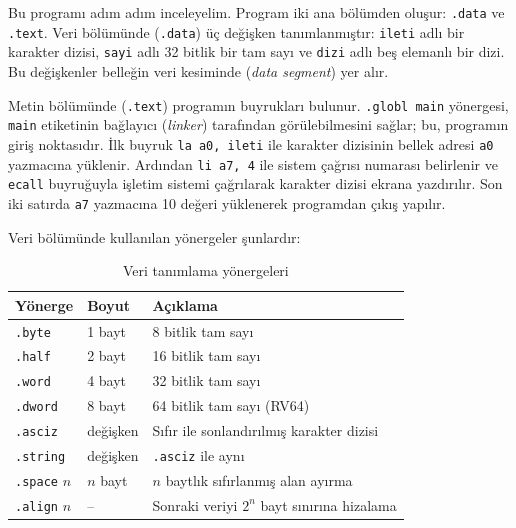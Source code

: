 Bu programı adım adım inceleyelim. Program iki ana bölümden oluşur: \texttt{.data} ve \texttt{.text}. Veri bölümünde (\texttt{.data}) üç değişken tanımlanmıştır: \texttt{ileti} adlı bir karakter dizisi, \texttt{sayi} adlı 32 bitlik bir tam sayı ve \texttt{dizi} adlı beş elemanlı bir dizi. Bu değişkenler belleğin veri kesiminde (\emph{data segment}) yer alır.

Metin bölümünde (\texttt{.text}) programın buyrukları bulunur. \texttt{.globl main} yönergesi, \texttt{main} etiketinin bağlayıcı (\emph{linker}) tarafından görülebilmesini sağlar; bu, programın giriş noktasıdır. İlk buyruk \texttt{la a0, ileti} ile karakter dizisinin bellek adresi \texttt{a0} yazmacına yüklenir. Ardından \texttt{li a7, 4} ile sistem çağrısı numarası belirlenir ve \texttt{ecall} buyruğuyla işletim sistemi çağrılarak karakter dizisi ekrana yazdırılır. Son iki satırda \texttt{a7} yazmacına 10 değeri yüklenerek programdan çıkış yapılır.

Veri bölümünde kullanılan yönergeler şunlardır:

\begin{table}[H]
\centering
\caption{Veri tanımlama yönergeleri}
\label{tab:veri-yonergeleri}
\small
\begin{tabularx}{\textwidth}{l l X}
\toprule
\textbf{Yönerge} & \textbf{Boyut} & \textbf{Açıklama} \\
\midrule
\texttt{.byte} & 1 bayt & 8 bitlik tam sayı \\
\texttt{.half} & 2 bayt & 16 bitlik tam sayı \\
\texttt{.word} & 4 bayt & 32 bitlik tam sayı \\
\texttt{.dword} & 8 bayt & 64 bitlik tam sayı (RV64) \\
\texttt{.asciz} & değişken & Sıfır ile sonlandırılmış karakter dizisi \\
\texttt{.string} & değişken & \texttt{.asciz} ile aynı \\
\texttt{.space} $n$ & $n$ bayt & $n$ baytlık sıfırlanmış alan ayırma \\
\texttt{.align} $n$ & -- & Sonraki veriyi $2^n$ bayt sınırına hizalama \\
\bottomrule
\end{tabularx}
\end{table}

